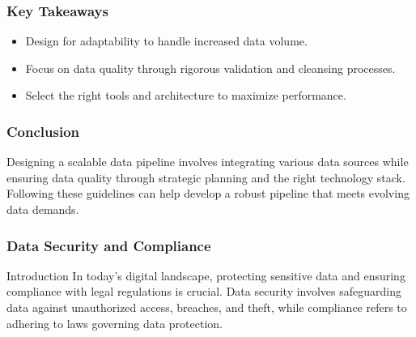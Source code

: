 \documentclass{beamer}
\begin{document}
\begin{frame}[fragile]
    \frametitle{Key Takeaways}
    \begin{itemize}
        \item Design for adaptability to handle increased data volume.
        \item Focus on data quality through rigorous validation and cleansing processes.
        \item Select the right tools and architecture to maximize performance.
    \end{itemize}
\end{frame}

\begin{frame}[fragile]
    \frametitle{Conclusion}
    Designing a scalable data pipeline involves integrating various data sources while ensuring data quality through strategic planning and the right technology stack. 
    Following these guidelines can help develop a robust pipeline that meets evolving data demands.
\end{frame}

\begin{frame}[fragile]
    \frametitle{Data Security and Compliance}
    \begin{block}{Introduction}
        In today's digital landscape, protecting sensitive data and ensuring compliance with legal regulations is crucial. 
        Data security involves safeguarding data against unauthorized access, breaches, and theft, while compliance refers to adhering to laws governing data protection.
    \end{block}
\end{frame}
\end{document}
